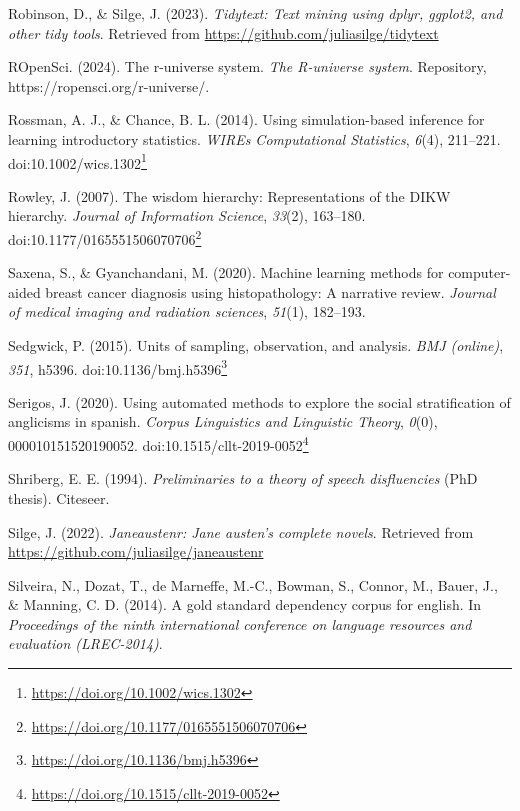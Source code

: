 \documentclass[
  letterpaper,
]{book}
\newlength{\cslhangindent}
\newenvironment{CSLReferences}[2] %
 {\begin{list}{}{%
  \setlength{\itemindent}{0pt}
  \setlength{\leftmargin}{0pt}
  \setlength{\parsep}{0pt}
  \ifodd #1
   \setlength{\leftmargin}{\cslhangindent}
   \setlength{\itemindent}{-1\cslhangindent}
  \fi
  \setlength{\itemsep}{#2\baselineskip}}}
 {\end{list}}
\theoremstyle{definition}
\theoremstyle{remark}
\DeclareRobustCommand{\href}[2]{#2\footnote{\url{#1}}}
\begin{document}
\begin{CSLReferences}{1}{0}
Robinson, D., \& Silge, J. (2023). \emph{Tidytext: Text mining using
dplyr, ggplot2, and other tidy tools}. Retrieved from
\url{https://github.com/juliasilge/tidytext}

ROpenSci. (2024). The r-universe system. \emph{The R-universe system}.
Repository, https://ropensci.org/r-universe/.

Rossman, A. J., \& Chance, B. L. (2014). Using simulation-based
inference for learning introductory statistics. \emph{WIREs
Computational Statistics}, \emph{6}(4), 211--221.
doi:\href{https://doi.org/10.1002/wics.1302}{10.1002/wics.1302}

Rowley, J. (2007). The wisdom hierarchy: Representations of the DIKW
hierarchy. \emph{Journal of Information Science}, \emph{33}(2),
163--180.
doi:\href{https://doi.org/10.1177/0165551506070706}{10.1177/0165551506070706}

Saxena, S., \& Gyanchandani, M. (2020). Machine learning methods for
computer-aided breast cancer diagnosis using histopathology: A narrative
review. \emph{Journal of medical imaging and radiation sciences},
\emph{51}(1), 182--193.

Sedgwick, P. (2015). Units of sampling, observation, and analysis.
\emph{BMJ (online)}, \emph{351}, h5396.
doi:\href{https://doi.org/10.1136/bmj.h5396}{10.1136/bmj.h5396}

Serigos, J. (2020). Using automated methods to explore the social
stratification of anglicisms in spanish. \emph{Corpus Linguistics and
Linguistic Theory}, \emph{0}(0), 000010151520190052.
doi:\href{https://doi.org/10.1515/cllt-2019-0052}{10.1515/cllt-2019-0052}

Shriberg, E. E. (1994). \emph{Preliminaries to a theory of speech
disfluencies} (PhD thesis). Citeseer.

Silge, J. (2022). \emph{Janeaustenr: Jane austen's complete novels}.
Retrieved from \url{https://github.com/juliasilge/janeaustenr}

Silveira, N., Dozat, T., de Marneffe, M.-C., Bowman, S., Connor, M.,
Bauer, J., \& Manning, C. D. (2014). A gold standard dependency corpus
for english. In \emph{Proceedings of the ninth international conference
on language resources and evaluation (LREC-2014)}.


\end{CSLReferences}
\end{document}

